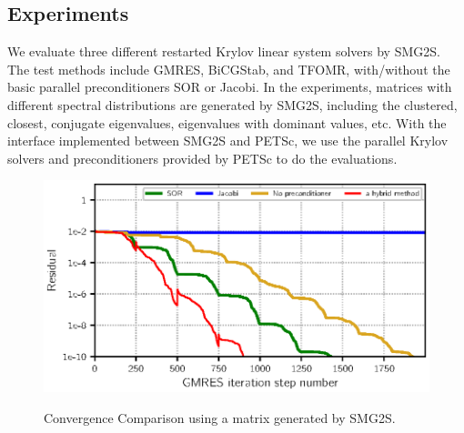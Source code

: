 \subsection{Experiments}

We evaluate three different restarted Krylov linear system solvers by SMG2S. The test methods include GMRES, BiCGStab, and TFOMR, with/without the basic parallel preconditioners SOR or Jacobi. In the experiments, matrices with different spectral distributions are generated by SMG2S, including the clustered, closest, conjugate eigenvalues, eigenvalues with dominant values, etc. With the interface implemented between SMG2S and PETSc, we use the parallel Krylov solvers and preconditioners provided by PETSc to do the evaluations.

\begin{figure}[t]
	\caption{Convergence Comparison using a matrix generated by SMG2S.}
	\centering
	\includegraphics[width=0.99\linewidth]{fig/smg2s_convergence.eps}
		\label{fig:smg2s-convergence}
\end{figure}


